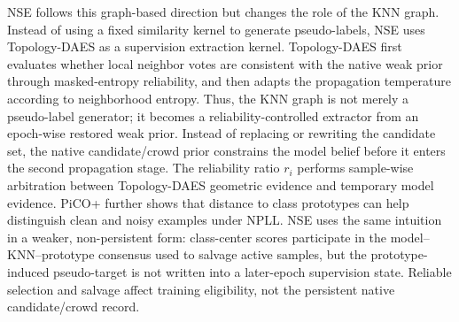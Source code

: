 NSE follows this graph-based direction but changes the role of the KNN graph.
Instead of using a fixed similarity kernel to generate pseudo-labels, NSE uses
Topology-DAES as a supervision extraction kernel. Topology-DAES first evaluates
whether local neighbor votes are consistent with the native weak prior through
masked-entropy reliability, and then adapts the propagation temperature
according to neighborhood entropy. Thus, the KNN graph is not merely a
pseudo-label generator; it becomes a reliability-controlled extractor from an
epoch-wise restored weak prior. Instead of replacing or rewriting the candidate
set, the native candidate/crowd prior constrains the model belief before it
enters the second propagation stage. The reliability ratio $r_i$ performs
sample-wise arbitration between Topology-DAES geometric evidence and temporary
model evidence. PiCO+ further shows that distance to class prototypes can help
distinguish clean and noisy examples under NPLL. NSE uses the same intuition in
a weaker, non-persistent form: class-center scores participate in the
model--KNN--prototype consensus used to salvage active samples, but the
prototype-induced pseudo-target is not written into a later-epoch supervision
state. Reliable selection and salvage affect training eligibility, not the
persistent native candidate/crowd record.
